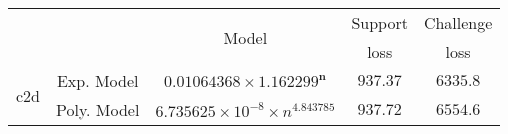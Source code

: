 \begin{tabular}{ccccc} 
\hline 
 &  & \multirow{2}{*}{Model} & Support & Challenge\tabularnewline 
 &  &  & loss  & loss\tabularnewline 
\hline 
\hline 
\multirow{2}{*}{c2d} & Exp. Model & $\mathbf{0.01064368\times 1.162299^{n}}$ & $\mathbf{937.37}$ & $\mathbf{6335.8}$ \tabularnewline 
 & Poly. Model & $6.735625\times10^{-8}\times n^{4.843785}$ & $937.72$ & $6554.6$ \tabularnewline 
\hline 
\end{tabular} 

